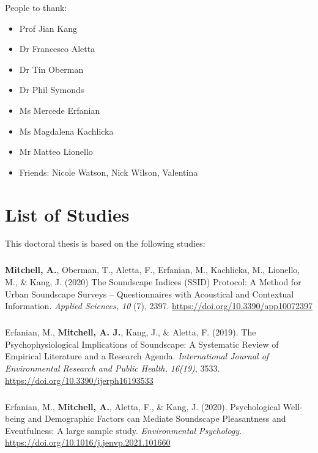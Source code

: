 \documentclass[oneside,fontsize=13pt,titlepage]{scrbook}
\begin{document}
People to thank:
\begin{itemize}
      \item Prof Jian Kang
      \item Dr Francesco Aletta
      \item Dr Tin Oberman
      \item Dr Phil Symonds
      \item Ms Mercede Erfanian
      \item Ms Magdalena Kachlicka
      \item Mr Matteo Lionello
      \item Friends: Nicole Watson, Nick Wilson, Valentina
\end{itemize}

\chapter*{List of Studies}

This doctoral thesis is based on the following studies:

\paragraph*{}
\textbf{Mitchell, A.}, Oberman, T., Aletta, F., Erfanian, M., Kachlicka, M., Lionello, M., \& Kang, J. (2020) The Soundscape Indices (SSID) Protocol: A Method for Urban Soundscape Surveys -- Questionnaires with Acoustical and Contextual Information. \emph{Applied Sciences, 10} (7), 2397. \url{https://doi.org/10.3390/app10072397}

\paragraph*{}
Erfanian, M., \textbf{Mitchell, A. J.}, Kang, J., \& Aletta, F. (2019). The Psychophysiological Implications of Soundscape: A Systematic Review of Empirical Literature and a Research Agenda. \emph{International Journal of Environmental Research and Public Health, 16(19)}, 3533. \url{https://doi.org/10.3390/ijerph16193533}

\paragraph*{}
Erfanian, M., \textbf{Mitchell, A.}, Aletta, F., \& Kang, J. (2020). Psychological Well-being and Demographic Factors can Mediate Soundscape Pleasantness and Eventfulness: A large sample study. \emph{Environmental Psychology}. \url{https://doi.org/10.1016/j.jenvp.2021.101660}
\end{document}
